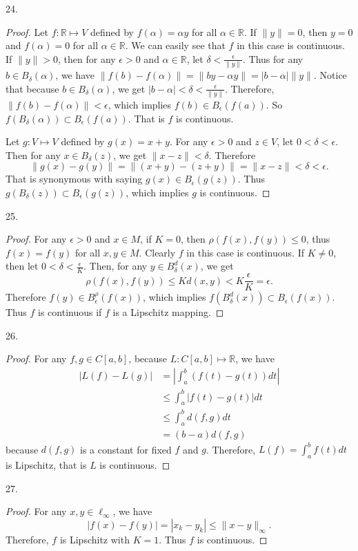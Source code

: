\documentclass[12pt, a4paper]{article}
\theoremstyle{plain}
\newcommand{\R}{\mathbb{R}}
\begin{document}
24.
\begin{proof}
Let $f:\R\mapsto V$ defined by $f(\alpha)=\alpha y$ for all $\alpha\in\R$. If $\|y\|=0$, then $y=0$ and $f(\alpha)=0$ for all $\alpha\in\R$. We can easily see that $f$ in this case is continuous. If $\|y\|>0$, then for any $\epsilon>0$ and $\alpha\in\R$, let $\delta<\frac{\epsilon}{\|y\|}$. Thus for any $b\in B_\delta(\alpha)$, we have $\|f(b)-f(\alpha)\|=\|by-\alpha y\|=|b-\alpha|\|y\|$. Notice that because $b\in B_\delta(\alpha)$, we get $|b-\alpha|<\delta<\frac{\epsilon}{\|y\|}$. Therefore, $\|f(b)-f(\alpha)\|<\epsilon$, which implies $f(b)\in B_\epsilon(f(a))$. So $f(B_\delta(\alpha))\subset B_\epsilon(f(a))$. That is $f$ is continuous.

Let $g:V\mapsto V$ defined by $g(x)=x+y$. For any $\epsilon>0$ and $z\in V$, let $0<\delta<\epsilon$. Then for any $x\in B_\delta(z)$, we get $\|x-z\|<\delta$. Therefore
\[
\|g(x)-g(y)\|=\|(x+y)-(z+y)\|=\|x-z\|<\delta<\epsilon.
\]
That is synonymous with saying $g(x)\in B_\epsilon(g(z))$. Thus $g(B_\delta(z))\subset B_\epsilon(g(z))$, which implies $g$ is continuous.
\end{proof}

\pagebreak

25.
\begin{proof}
For any $\epsilon>0$ and $x\in M$, if $K=0$, then $\rho(f(x),f(y))\leq 0$, thus $f(x)=f(y)$ for all $x,y\in M$. Clearly $f$ in this case is continuous. If $K\neq 0$, then let $0<\delta<\frac{\epsilon}{K}$. Then, for any $y\in B_\delta^d(x)$, we get
\[
\rho(f(x),f(y))\leq Kd(x,y)<K\frac{\epsilon}{K}=\epsilon.
\]
Therefore $f(y)\in B_\epsilon^\rho(f(x))$, which implies $f(B_\delta^d(x))\subset B_\epsilon(f(x))$. Thus $f$ is continuous if $f$ is a Lipschitz mapping.
\end{proof}

26.
\begin{proof}
For any $f,g\in C[a,b]$, because $L:C[a,b]\mapsto \R$, we have
\begin{align*}
|L(f)-L(g)|&= \left|\int_{a}^{b}{(f(t)-g(t))dt}\right|\\
&\leq \int_{a}^{b}{|f(t)-g(t)|dt}\\
&\leq \int_{a}^{b}{d(f,g)dt}\\
&=(b-a)d(f,g)
\end{align*}
because $d(f,g)$ is a constant for fixed $f$ and $g$. Therefore, $L(f)=\int_{a}^{b}{f(t)dt}$ is Lipschitz, that is $L$ is continuous.
\end{proof}

27.
\begin{proof}
For any $x,y\in \ell_\infty$, we have
\[
|f(x)-f(y)|=|x_k-y_k|\leq \|x-y\|_\infty.
\]
Therefore, $f$ is Lipschitz with $K=1$. Thus $f$ is continuous.
\end{proof}
\end{document}

